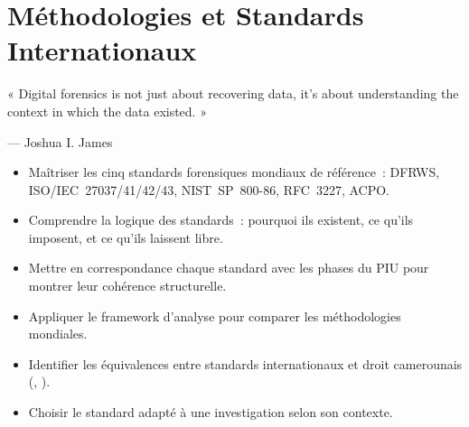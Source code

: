 
\chapter{Méthodologies et Standards Internationaux}
\label{chap:meth-std}

\epigraph{%
    « Digital forensics is not just about recovering data, it's about
    understanding the context in which the data existed. »%
}{--- Joshua I. James}


\begin{boxobjectifs}
\begin{itemize}
    \item Maîtriser les cinq standards forensiques mondiaux de référence~:
          DFRWS, ISO/IEC~27037/41/42/43, NIST~SP~800-86, RFC~3227, ACPO.
    \item Comprendre la logique des standards~: pourquoi ils existent,
          ce qu'ils imposent, et ce qu'ils laissent libre.
    \item Mettre en correspondance chaque standard avec les phases du PIU
          pour montrer leur cohérence structurelle.
    \item Appliquer le framework d'analyse  pour comparer
          les méthodologies mondiales.
    \item Identifier les équivalences entre standards internationaux et
          droit camerounais (, ).
    \item Choisir le standard adapté à une investigation selon son contexte.
\end{itemize}
\end{boxobjectifs}

\bigskip

